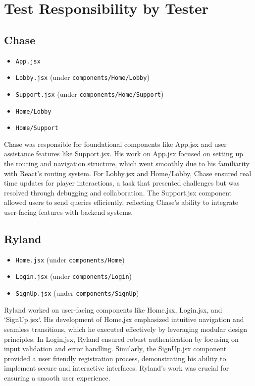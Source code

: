 \documentclass[12pt]{article}
\begin{document}
\section*{Test Responsibility by Tester}

\subsection*{Chase}
\begin{itemize}
    \item \texttt{App.jsx}
    \item \texttt{Lobby.jsx} (under \texttt{components/Home/Lobby})
    \item \texttt{Support.jsx} (under \texttt{components/Home/Support})
    \item \texttt{Home/Lobby}
    \item \texttt{Home/Support}
\end{itemize}

\noindent Chase was responsible for foundational components like App.jsx and user assistance features like Support.jsx. His work on App.jsx focused on setting up the routing and navigation structure, which went smoothly due to his familiarity with React's routing system. For Lobby.jsx and Home/Lobby, Chase ensured real time updates for player interactions, a task that presented challenges but was resolved through debugging and collaboration. The Support.jsx component allowed users to send queries efficiently, reflecting Chase's ability to integrate user-facing features with backend systems.

\subsection*{Ryland}
\begin{itemize}
    \item \texttt{Home.jsx} (under \texttt{components/Home})
    \item \texttt{Login.jsx} (under \texttt{components/Login})
    \item \texttt{SignUp.jsx} (under \texttt{components/SignUp})
\end{itemize}

\noindent Ryland worked on user-facing components like Home.jsx, Login.jsx, and `SignUp.jsx`. His development of Home.jsx emphasized intuitive navigation and seamless transitions, which he executed effectively by leveraging modular design principles. In Login.jsx, Ryland ensured robust authentication by focusing on input validation and error handling. Similarly, the SignUp.jsx component provided a user friendly registration process, demonstrating his ability to implement secure and interactive interfaces. Ryland’s work was crucial for ensuring a smooth user experience.
\end{document}
